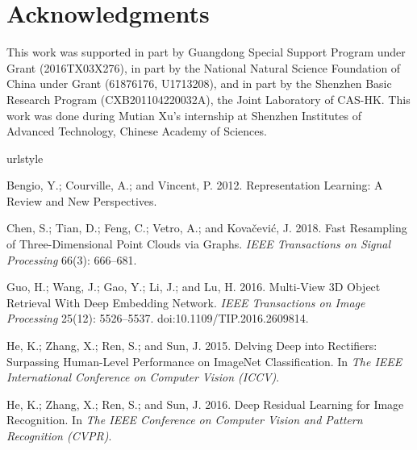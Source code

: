\documentclass[letterpaper]{article} \usepackage{aaai21}  \usepackage{times}  \usepackage{helvet} \usepackage{courier}  \usepackage[hyphens]{url}  \usepackage{graphicx} \urlstyle{rm} \def\UrlFont{\rm}  \usepackage{natbib}  \usepackage{caption} \frenchspacing  \setlength{\pdfpagewidth}{8.5in}  \setlength{\pdfpageheight}{11in}  \usepackage{color}
\begin{document}
\section{Acknowledgments}
This work was supported in part by Guangdong Special Support Program under Grant (2016TX03X276), in part by the National Natural Science Foundation of China under Grant (61876176, U1713208), and in part by the Shenzhen Basic Research Program (CXB201104220032A), the Joint Laboratory of CAS-HK. This work was done during Mutian Xu's internship at Shenzhen Institutes of Advanced Technology, Chinese Academy of Sciences.












{\small
\begin{thebibliography}{38}
\providecommand{\natexlab}[1]{#1}
\providecommand{\url}[1]{\texttt{#1}}
\providecommand{\urlprefix}{URL }
\expandafter\ifx\csname urlstyle\endcsname\relax
  \providecommand{\doi}[1]{doi:\discretionary{}{}{}#1}\else
  \providecommand{\doi}{doi:\discretionary{}{}{}\begingroup
  \urlstyle{rm}\Url}\fi

Bengio, Y.; Courville, A.; and Vincent, P. 2012.
\newblock Representation Learning: A Review and New Perspectives.

{Chen}, S.; {Tian}, D.; {Feng}, C.; {Vetro}, A.; and {Kovačević}, J. 2018.
\newblock Fast Resampling of Three-Dimensional Point Clouds via Graphs.
\newblock \emph{IEEE Transactions on Signal Processing} 66(3): 666--681.

{Guo}, H.; {Wang}, J.; {Gao}, Y.; {Li}, J.; and {Lu}, H. 2016.
\newblock Multi-View 3D Object Retrieval With Deep Embedding Network.
\newblock \emph{IEEE Transactions on Image Processing} 25(12): 5526--5537.
\newblock \doi{10.1109/TIP.2016.2609814}.

He, K.; Zhang, X.; Ren, S.; and Sun, J. 2015.
\newblock Delving Deep into Rectifiers: Surpassing Human-Level Performance on
  ImageNet Classification.
\newblock In \emph{The IEEE International Conference on Computer Vision
  (ICCV)}.

He, K.; Zhang, X.; Ren, S.; and Sun, J. 2016.
\newblock Deep Residual Learning for Image Recognition.
\newblock In \emph{The IEEE Conference on Computer Vision and Pattern
  Recognition (CVPR)}.


\end{thebibliography}}
\end{document}
